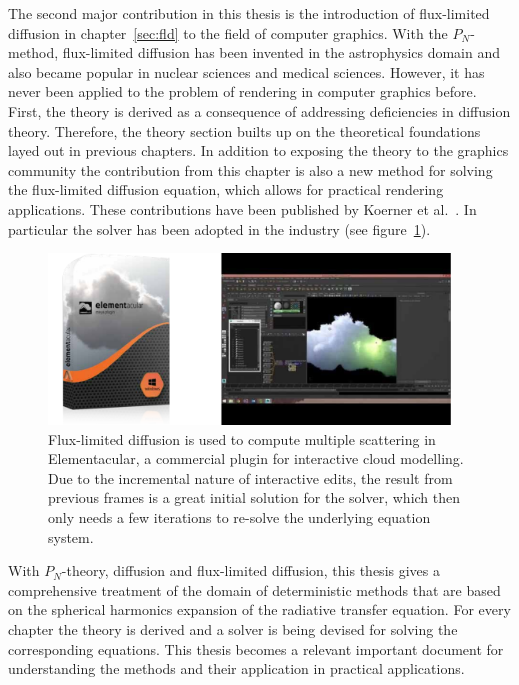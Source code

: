 The second major contribution in this thesis is the introduction of flux-limited diffusion in chapter~\ref{sec:fld} to the field of computer graphics. With the $P_N$-method, flux-limited diffusion has been invented in the astrophysics domain and also became popular in nuclear sciences and medical sciences. However, it has never been applied to the problem of rendering in computer graphics before. First, the theory is derived as a consequence of addressing deficiencies in diffusion theory. Therefore, the theory section builts up on the theoretical foundations layed out in previous chapters. In addition to exposing the theory to the graphics community the contribution from this chapter is also a new method for solving the flux-limited diffusion equation, which allows for practical rendering applications. These contributions have been published by Koerner et al.~\cite{Koerner14}. In particular the solver has been adopted in the industry (see figure~\ref{fig:fld_conclusion_elementacular_1}).
\begin{figure}[h]
\centering
\includegraphics[width=0.95\textwidth]{07_conclusion/figures/fig_elementacular.pdf}
\caption{Flux-limited diffusion is used to compute multiple scattering in Elementacular\protect\footnotemark, a commercial plugin for interactive cloud modelling. Due to the incremental nature of interactive edits, the result from previous frames is a great initial solution for the solver, which then only needs a few iterations to re-solve the underlying equation system.}
\label{fig:fld_conclusion_elementacular_1}
\end{figure}


With $P_N$-theory, diffusion and flux-limited diffusion, this thesis gives a comprehensive treatment of the domain of deterministic methods that are based on the spherical harmonics expansion of the radiative transfer equation. For every chapter the theory is derived and a solver is being devised for solving the corresponding equations. This thesis becomes a relevant important document for understanding the methods and their application in practical applications. 

